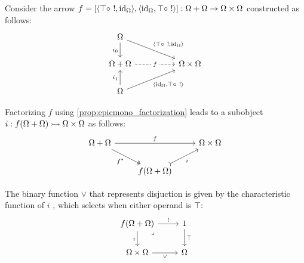 \begin{definition}[Disjunction]
  Consider the arrow $f = [\<\top\circ\ !,\id_\Omega\>, \<\id_\Omega,\top\circ\
  !\>]: \Omega + \Omega \to \Omega \times \Omega$ constructed as follows:
  \[\begin{tikzcd}[ampersand replacement=\&]
    \Omega \\
    {\Omega+\Omega} \&\& \Omega\times\Omega \\
    \Omega
    \arrow["{\langle\top\circ\ !,\id_\Omega\rangle}", from=1-1, to=2-3]
    \arrow["{\langle\id_\Omega,\top\circ\ !\rangle}"', from=3-1, to=2-3]
    \arrow["{i_0}"', from=1-1, to=2-1]
    \arrow["{i_1}", from=3-1, to=2-1]
    \arrow["f"{description}, dashed, from=2-1, to=2-3]
  \end{tikzcd}\]

  Factorizing $f$ using \ref{prop:epicmono_factorization} leads to a
  subobject $i: f(\Omega+\Omega)\rightarrowtail \Omega\times \Omega$ as follows:
  \[\begin{tikzcd}[ampersand replacement=\&]
    {\Omega+\Omega} \&\& \Omega\times\Omega \\
    \& {f(\Omega+\Omega)}
    \arrow["{f^*}"', two heads, from=1-1, to=2-2]
    \arrow["f", from=1-1, to=1-3]
    \arrow["i"', tail, from=2-2, to=1-3]
  \end{tikzcd}\]

  The binary function $\lor$ that represents disjuction is given by the
  characteristic function of $i$ \parencite[p.~138]{goldblatt:topoi}, which selects when either operand is $\top$:
  \[\begin{tikzcd}[ampersand replacement=\&]
    {f(\Omega+\Omega)} \& 1 \\
    \Omega\times\Omega \& \Omega
    \arrow["{!}", from=1-1, to=1-2]
    \arrow["\top", from=1-2, to=2-2]
    \arrow["\lor"', from=2-1, to=2-2]
    \arrow["\lrcorner"{anchor=center, pos=0.125}, draw=none, from=1-1, to=2-2]
    \arrow["i"', from=1-1, to=2-1]
  \end{tikzcd}\]
\end{definition}

